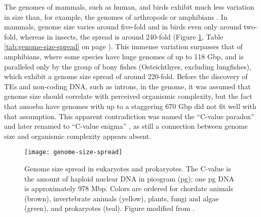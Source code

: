 The genomes of mammals, such as human, and birds exhibit much less
variation in size than, for example, the genomes of arthropods or
amphibians \citep{Gregory2005}.  In mammals, genome size varies around
five-fold and in birds even only around two-fold, whereas in insects,
the spread is around 240-fold (Figure \ref{fig:genome-size-spread},
Table \ref{tab:genome-size-spread} on page
\pageref{tab:genome-size-spread}).  This immense variation surpasses that
of amphibians, where some species have huge genomes of up to 118 Gbp,
and is paralleled only by the group of bony fishes (Osteichthyes,
excluding lungfishes), which exhibit a genome size spread of around
220-fold.  Before the discovery of TEs and non-coding DNA, such as
introns, in the genome, it was assumed that genome size should correlate
with perceived organismic complexity, but the fact that amoeba have
genomes with up to a staggering 670 Gbp \citep{Parfrey2008} did not fit
well with that assumption.  This apparent contradiction was named the
``C-value paradox'' and later renamed to ``C-value enigma''
\citep{Gregory2007}, as still a connection between genome size and
organismic complexity appears absent.

\begin{figure}
\centering
\texttt{[image: genome-size-spread]}
\caption[Genome size spread in eukaryotes and prokaryotes]{Genome size
spread in eukaryotes and prokaryotes.  The C-value is the amount of
haploid nuclear DNA in picogram (pg); one pg DNA is approximately 978
Mbp.  Colors are ordered for chordate animals (brown), invertebrate animals (yellow),
plants, fungi and algae (green), and prokaryotes (teal).  Figure modified from
\citet{Gregory2004}.}
\label{fig:genome-size-spread}
\end{figure}

